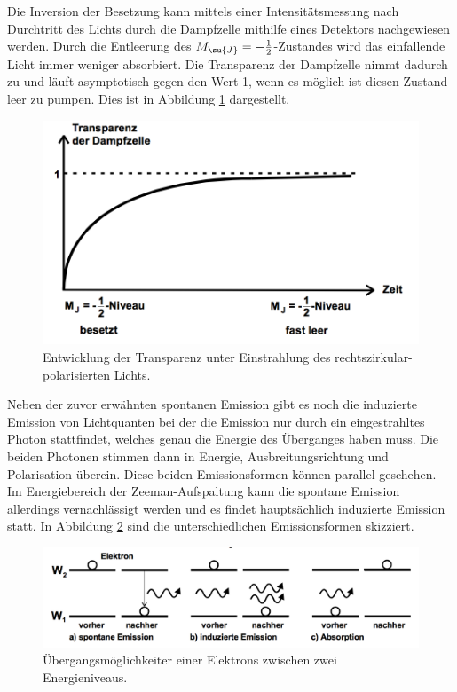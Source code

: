 Die Inversion der Besetzung kann mittels einer Intensitätsmessung nach Durchtritt des Lichts durch die Dampfzelle
mithilfe eines Detektors nachgewiesen werden. Durch die Entleerung des $M_{\su{J}}= -\frac{1}{2}$-Zustandes
wird das einfallende Licht immer weniger absorbiert.
Die Transparenz der Dampfzelle nimmt dadurch zu und läuft asymptotisch gegen den Wert 1, wenn es möglich ist diesen Zustand
leer zu pumpen. Dies ist in Abbildung \ref{fig:asymptotisch} dargestellt.
\begin{figure}
    \centering
    \includegraphics[scale = 0.45]{pictures/asymptotisch.png}
    \caption{Entwicklung der Transparenz unter Einstrahlung des rechtszirkular-polarisierten Lichts.\cite{1}}
    \label{fig:asymptotisch}
\end{figure}

\noindent Neben der zuvor erwähnten spontanen Emission gibt es noch die induzierte Emission von Lichtquanten bei der
die Emission nur durch ein eingestrahltes Photon stattfindet, welches genau die Energie
des Überganges haben muss. Die beiden Photonen stimmen dann in Energie, Ausbreitungsrichtung und Polarisation überein.
Diese beiden Emissionsformen können parallel geschehen. Im Energiebereich der Zeeman-Aufspaltung
kann die spontane Emission allerdings vernachlässigt werden und es findet hauptsächlich induzierte
Emission statt. In Abbildung \ref{fig:emission} sind die unterschiedlichen Emissionsformen skizziert.
\begin{figure}
    \centering
    \includegraphics[scale = 0.5]{pictures/emission.png}
    \caption{Übergangsmöglichkeiter einer Elektrons zwischen zwei Energieniveaus.\cite{1}}
    \label{fig:emission}
\end{figure}

